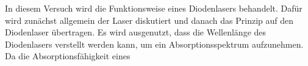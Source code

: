 In diesem Versuch wird die Funktionsweise eines Diodenlasers behandelt.
Dafür wird zunächst allgemein der Laser diskutiert und danach das Prinzip auf den Diodenlaser übertragen.
Es wird ausgenutzt, dass die Wellenlänge des Diodenlasers verstellt werden kann, um ein Absorptionsspektrum aufzunehmen.
Da die Absorptionsfähigkeit eines 
